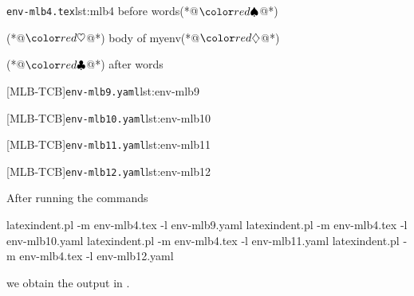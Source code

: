 \begin{minipage}{.45\linewidth}
\begin{cmhlistings}[escapeinside={(*@}{@*)}]{\texttt{env-mlb4.tex}}{lst:mlb4}
before words(*@$\BeginStartsOnOwnLine$@*)
\begin{myenv}(*@$\BodyStartsOnOwnLine$@*)
body of myenv(*@$\EndStartsOnOwnLine$@*)
\end{myenv}(*@$\EndFinishesWithLineBreak$@*)
after words
\end{cmhlistings}
\end{minipage}%
\hfill
\begin{minipage}{.51\textwidth}
[MLB-TCB]{\texttt{env-mlb9.yaml}}{lst:env-mlb9}

[MLB-TCB]{\texttt{env-mlb10.yaml}}{lst:env-mlb10}

[MLB-TCB]{\texttt{env-mlb11.yaml}}{lst:env-mlb11}

[MLB-TCB]{\texttt{env-mlb12.yaml}}{lst:env-mlb12}
\end{minipage}

After running the commands
\begin{commandshell}
latexindent.pl -m env-mlb4.tex -l env-mlb9.yaml
latexindent.pl -m env-mlb4.tex -l env-mlb10.yaml
latexindent.pl -m env-mlb4.tex -l env-mlb11.yaml
latexindent.pl -m env-mlb4.tex -l env-mlb12.yaml
\end{commandshell}

we obtain the output in .

\begin{minipage}{.45\linewidth}
\end{minipage}
\hfill
\begin{minipage}{.45\linewidth}
\end{minipage}

\begin{minipage}{.45\linewidth}
\end{minipage}
\hfill
\begin{minipage}{.45\linewidth}
\end{minipage}

